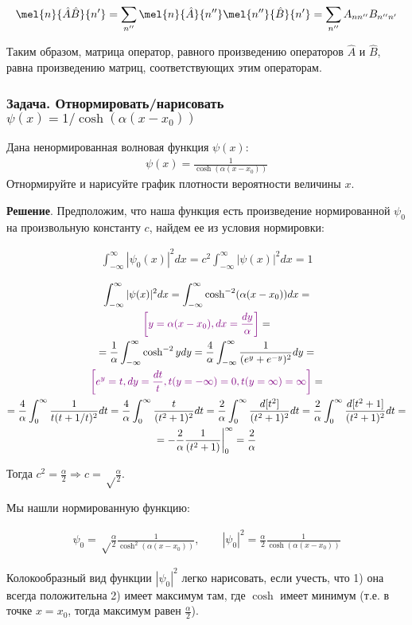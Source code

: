 $$\mel{n}{\hat A \hat B}{n'}=\sum\limits_{n''}\mel{n}{\hat A}{n'' }\mel{n''}{\hat B}{n'} =\sum\limits_{n''}A_{nn''}B_{n''n'}$$

Таким образом, матрица оператор, равного произведению операторов $\hat A$ и $\hat B$, равна произведению матриц, соответствующих этим операторам.
\subsubsection{Задача. Отнормировать/нарисовать $\psi(x)=1/\cosh(\alpha(x-x_0))$}

Дана ненормированная волновая функция $\psi(x)$:
\begin{gather*}
\psi(x)=\frac{1}{\cosh(\alpha(x-x_0))}
\end{gather*}
Отнормируйте и нарисуйте график плотности вероятности величины $x$.

\textbf{Решение}. Предположим, что наша функция есть произведение нормированной $\psi_0$ на произвольную константу $c$, найдем ее из условия нормировки:

\begin{gather*}
\int_{-\infty}^{\infty}|\psi_0(x)|^2 dx=
c^2\int_{-\infty}^{\infty}|\psi(x)|^2 dx=1
\end{gather*}

\begin{gather*}
\int_{-\infty}^{\infty}|\psi(x)|^2 dx=
\int_{-\infty}^{\infty} \cosh^{-2}(\alpha(x-x_0)) dx=\\
\textcolor{violet}{\left[ y=\alpha(x-x_0), dx=\frac{dy}{\alpha}\right]}=\\=
\frac{1}{\alpha}\int_{-\infty}^{\infty} \cosh^{-2}y dy=
\frac{4}{\alpha}\int_{-\infty}^{\infty} \frac{1}{(e^y+e^{-y})^2}dy=\\
\textcolor{violet}{\left[ e^y=t, dy=\frac{dt}{t}, t(y=-\infty)=0, t(y=\infty)=\infty\right]}=\\=
%
\frac{4}{\alpha}\int_0^{\infty} \frac{1}{t(t+1/t)^2}dt=
\frac{4}{\alpha}\int_0^{\infty} \frac{t}{(t^2+1)^2}dt=
\frac{2}{\alpha}\int_0^{\infty} \frac{d[t^2]}{(t^2+1)^2}dt=
\frac{2}{\alpha}\int_0^{\infty} \frac{d[t^2+1]}{(t^2+1)^2}dt=\\=
-\frac{2}{\alpha}\frac{1}{(t^2+1)}\bigg|_{0}^{\infty}=
\frac{2}{\alpha}
\end{gather*}

Тогда  $c^2=\frac{\alpha}{2} \Rightarrow c=\sqrt\frac{\alpha}{2} $.

Мы нашли нормированную функцию:

\begin{gather*}
\psi_0=\sqrt\frac{\alpha}{2}\frac{1}{\cosh^2(\alpha(x-x_0))},\qquad
|\psi_0|^2=\frac{\alpha}{2}\frac{1}{\cosh(\alpha(x-x_0))}
\end{gather*}

Колокообразный вид функции $|\psi_0|^2$ легко нарисовать,  если учесть, что 1) она всегда положительна 2) имеет максимум там, где $\cosh$ имеет минимум (т.е. в точке $x=x_0$, тогда максимум равен $\frac{\alpha}{2}$).